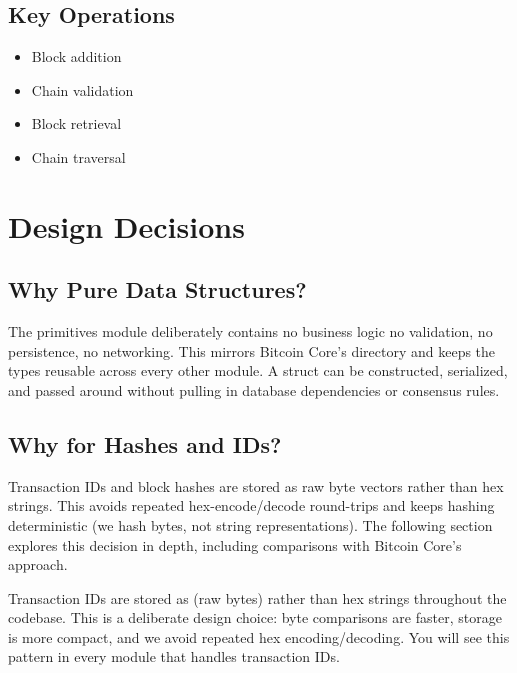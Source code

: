 \subsection{Key Operations}
\label{sec:ch06-blockchain-operations}

\begin{itemize}
  \item {}Block addition
  \item {}Chain validation
  \item {}Block retrieval
  \item {}Chain traversal
\end{itemize}

\section{Design Decisions}
\label{sec:ch06-design-decisions}

\subsection{Why Pure Data Structures?}
\label{sec:ch06-pure-data}

The primitives module deliberately contains no business logic \textendash{} no validation, no persistence, no networking. This mirrors Bitcoin Core's  directory and keeps the types reusable across every other module. A  struct can be constructed, serialized, and passed around without pulling in database dependencies or consensus rules.

\subsection{Why  for Hashes and IDs?}
\label{sec:ch06-vecu8-hashes}

Transaction IDs and block hashes are stored as raw byte vectors rather than hex strings. This avoids repeated hex-encode/decode round-trips and keeps hashing deterministic (we hash bytes, not string representations). The following section explores this decision in depth, including comparisons with Bitcoin Core's approach.

\begin{warnbox}
Transaction IDs are stored as  (raw bytes) rather than hex strings throughout the codebase. This is a deliberate design choice: byte comparisons are faster, storage is more compact, and we avoid repeated hex encoding/decoding. You will see this pattern in every module that handles transaction IDs.
\end{warnbox}

